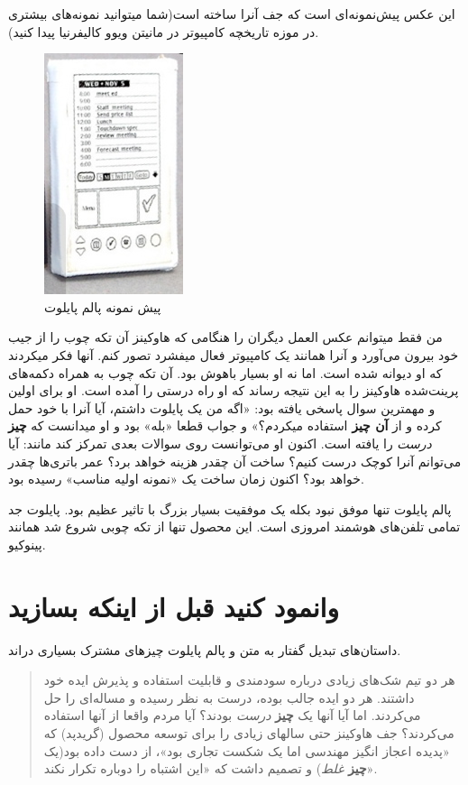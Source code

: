این عکس پیش‌نمونه‌ای است که جف آنرا ساخته است(شما میتوانید نمونه‌های
بیشتری در موزه تاریخچه کامپیوتر در مانیتن ویوو کالیفرنیا پیدا کنید).

\begin{figure}[htbp]
\centering
\includegraphics{palmpilot.png}
\caption{پیش نمونه پالم پایلوت}
\end{figure}

من فقط میتوانم عکس العمل دیگران را هنگامی که هاوکینز آن تکه چوب را از
جیب خود بیرون می‌آورد و آنرا همانند یک کامپیوتر فعال میفشرد تصور کنم.
آنها فکر میکردند که او دیوانه شده است. اما نه او بسیار باهوش بود. آن تکه
چوب به همراه دکمه‌های پرینت‌شده هاوکینز را به این نتیجه رساند که او راه
درستی را آمده است. او برای اولین و مهمترین سوال پاسخی یافته بود: «اگه من
یک پایلوت داشتم، آیا آنرا با خود حمل کرده و از \textbf{آن چیز} استفاده
میکردم؟» و جواب قطعا «بله» بود و او میدانست که \textbf{چیز} \emph{درست}
را یافته است. اکنون او می‌توانست روی سوالات بعدی تمرکز کند مانند: آیا
می‌توانم آنرا کوچک درست کنیم؟ ساخت آن چقدر هزینه خواهد برد؟ عمر باتری‌ها
چقدر خواهد بود؟ اکنون زمان ساخت یک «نمونه اولیه مناسب» رسیده بود.

پالم پایلوت تنها موفق نبود بکله یک موفقیت بسیار بزرگ با تاثیر عظیم بود.
پایلوت جد تمامی تلفن‌های هوشمند امروزی است. این محصول تنها از تکه چوبی
شروع شد همانند پینوکیو.

\section{وانمود کنید قبل از اینکه
بسازید}\label{ux648ux627ux646ux645ux648ux62f-ux6a9ux646ux6ccux62f-ux642ux628ux644-ux627ux632-ux627ux6ccux646ux6a9ux647-ux628ux633ux627ux632ux6ccux62f}

داستان‌های تبدیل گفتار به متن و پالم پایلوت چیزهای مشترک بسیاری دراند.

\begin{quote}
هر دو تیم شک‌های زیادی درباره سودمندی و قابلیت استفاده و پذیرش ایده خود
داشتند. هر دو ایده جالب بوده، درست به نظر رسیده و مساله‌ای را حل
می‌کردند. اما آیا آنها یک \textbf{چیز} \emph{درست} بودند؟ آیا مردم واقعا
از آنها استفاده می‌کردند؟ جف هاوکینز حتی سالهای زیادی را برای توسعه
محصول (گریدپد) که «پدیده اعجاز انگیز مهندسی اما یک شکست تجاری بود»، از
دست داده بود(یک \textbf{چیز} \emph{غلط}) و تصمیم داشت که «این اشتباه را
دوباره تکرار نکند».
\end{quote}


